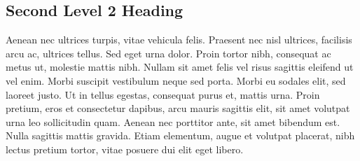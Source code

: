 \subsection{Second Level 2 Heading}

Aenean nec ultrices turpis, vitae vehicula felis. Praesent nec nisl ultrices, facilisis arcu ac, ultrices tellus. Sed eget urna dolor. Proin tortor nibh, consequat ac metus ut, molestie mattis nibh. Nullam sit amet felis vel risus sagittis eleifend ut vel enim. Morbi suscipit vestibulum neque sed porta. Morbi eu sodales elit, sed laoreet justo. Ut in tellus egestas, consequat purus et, mattis urna. Proin pretium, eros et consectetur dapibus, arcu mauris sagittis elit, sit amet volutpat urna leo sollicitudin quam. Aenean nec porttitor ante, sit amet bibendum est. Nulla sagittis mattis gravida. Etiam elementum, augue et volutpat placerat, nibh lectus pretium tortor, vitae posuere dui elit eget libero.
